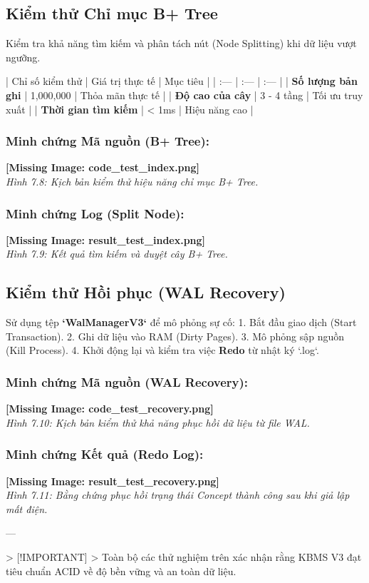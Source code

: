 \subsection{Kiểm thử Chỉ mục B+ Tree}

Kiểm tra khả năng tìm kiếm và phân tách nút (Node Splitting) khi dữ liệu vượt ngưỡng.

| Chỉ số kiểm thử | Giá trị thực tế | Mục tiêu |
| :--- | :--- | :--- |
| \textbf{Số lượng bản ghi} | 1,000,000 | Thỏa mãn thực tế |
| \textbf{Độ cao của cây} | 3 - 4 tầng | Tối ưu truy xuất |
| \textbf{Thời gian tìm kiếm} | < 1ms | Hiệu năng cao |

\subsubsection{Minh chứng Mã nguồn (B+ Tree):}
\textbf{[Missing Image: code_test_index.png]}\\ \textit{Hình 7.8: Kịch bản kiểm thử hiệu năng chỉ mục B+ Tree.}

\subsubsection{Minh chứng Log (Split Node):}
\textbf{[Missing Image: result_test_index.png]}\\ \textit{Hình 7.9: Kết quả tìm kiếm và duyệt cây B+ Tree.}

\subsection{Kiểm thử Hồi phục (WAL Recovery)}

Sử dụng tệp \textbf{`WalManagerV3`} để mô phỏng sự cố:
1.  Bắt đầu giao dịch (Start Transaction).
2.  Ghi dữ liệu vào RAM (Dirty Pages).
3.  Mô phỏng sập nguồn (Kill Process).
4.  Khởi động lại và kiểm tra việc \textbf{Redo} từ nhật ký `.log`.

\subsubsection{Minh chứng Mã nguồn (WAL Recovery):}
\textbf{[Missing Image: code_test_recovery.png]}\\ \textit{Hình 7.10: Kịch bản kiểm thử khả năng phục hồi dữ liệu từ file WAL.}

\subsubsection{Minh chứng Kết quả (Redo Log):}
\textbf{[Missing Image: result_test_recovery.png]}\\ \textit{Hình 7.11: Bằng chứng phục hồi trạng thái Concept thành công sau khi giả lập mất điện.}

---

> [!IMPORTANT]
> Toàn bộ các thử nghiệm trên xác nhận rằng KBMS V3 đạt tiêu chuẩn ACID về độ bền vững và an toàn dữ liệu.

